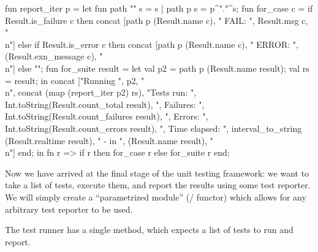 \nwenddocs{}\endmoddef\nwstartdeflinemarkup{}\nwenddeflinemarkup
fun report_iter p =
  let
    fun path "" s = s
      | path p s = p^"."^s; 
    fun for_case c =
      if Result.is_failure c
      then concat [path p (Result.name c),
                   " FAIL: ",
                   Result.msg c,
                   "\\n"]
      else if Result.is_error c
      then concat [path p (Result.name c),
                   " ERROR: ",
                   (Result.exn_message c),
                   "\\n"]
      else "";
    fun for_suite result =
      let
        val p2 = path p (Result.name result);
        val rs =  result;
      in
        concat ["Running ", p2, "\\n",
                concat (map (report_iter p2) rs),
                "Tests run: ",
                Int.toString(Result.count_total result),
                ", Failures: ",
                Int.toString(Result.count_failures result),
                ", Errors: ",
                Int.toString(Result.count_errors result),
                ", Time elapsed: ",
                interval_to_string (Result.realtime result),
                " - in ",
                (Result.name result), "\\n"]
      end;
  in
    fn r => if  r then for_case r
            else for_suite r
  end;
\nwendcode{}\nwdocspar

\begin{node}
Now we have arrived at the final stage of the unit testing framework:
we want to take a list of tests, execute them, and report the results
using some test reporter. We will simply create a ``parametrized module''
(\SML/ functor) which allows for any arbitrary test reporter to be used.

The test runner has a single method, which expects a list of tests to
run and report.
\end{node}

